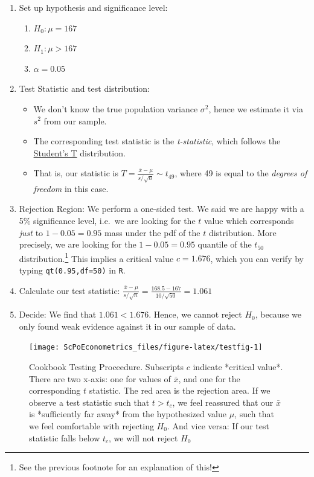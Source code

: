 \documentclass[]{book}
\providecommand{\tightlist}{%
  \setlength{\itemsep}{0pt}\setlength{\parskip}{0pt}}
\let\rmarkdownfootnote\footnote%
\def\footnote{\protect\rmarkdownfootnote}
\begin{document}
\begin{enumerate}
\def\labelenumi{\arabic{enumi}.}
\tightlist
\item
  Set up hypothesis and significance level:

  \begin{enumerate}
  \def\labelenumii{\arabic{enumii}.}
  \tightlist
  \item
    \(H_0: \mu = 167\)
  \item
    \(H_1: \mu > 167\)
  \item
    \(\alpha = 0.05\)
  \end{enumerate}
\item
  Test Statistic and test distribution:

  \begin{itemize}
  \tightlist
  \item
    We don't know the true population variance \(\sigma^2\), hence we estimate it via \(s^2\) from our sample.
  \item
    The corresponding test statistic is the \emph{t-statistic}, which follows the \href{https://en.wikipedia.org/wiki/Student's_t-distribution}{Student's T} distribution.
  \item
    That is, our statistic is \(T=\frac{\bar{x} - \mu}{s/\sqrt{n}} \sim t_{49}\), where 49 is equal to the \emph{degrees of freedom} in this case.
  \end{itemize}
\item
  Rejection Region:
  We perform a one-sided test. We said we are happy with a 5\% significance level, i.e.~we are looking for the \(t\) value which corresponds \emph{just} to \(1-0.05 = 0.95\) mass under the pdf of the \(t\) distribution. More precisely, we are looking for the \(1-0.05 = 0.95\) quantile of the \(t_{50}\) distribution.\footnote{See the previous footnote for an explanation of this!} This implies a critical value \(c = 1.676\), which you can verify by typing \texttt{qt(0.95,df=50)} in \texttt{R}.
\item
  Calculate our test statistic:
  \(\frac{\bar{x} - \mu}{s/\sqrt{n}} = \frac{168.5 - 167}{10/\sqrt{50}} = 1.061\)
\item
  Decide:
  We find that \(1.061 < 1.676\). Hence, we cannot reject \(H_0\), because we only found weak evidence against it in our sample of data.
\end{enumerate}

\begin{figure}

{\centering \texttt{[image: ScPoEconometrics\_files/figure-latex/testfig-1]} 

}

\caption{Cookbook Testing Proceedure. Subscripts $c$ indicate *critical value*. There are two x-axis: one for values of $\bar{x}$, and one for the corresponding $t$ statistic. The red area is the rejection area. If we observe a test statistic such that $t>t_c$, we feel reassured that our $\bar{x}$ is *sufficiently far away* from the hypothesized value $\mu$, such that we feel comfortable with rejecting $H_0$. And vice versa: If our test statistic falls below $t_c$, we will not reject $H_0$}\label{fig:testfig}
\end{figure}
\end{document}
